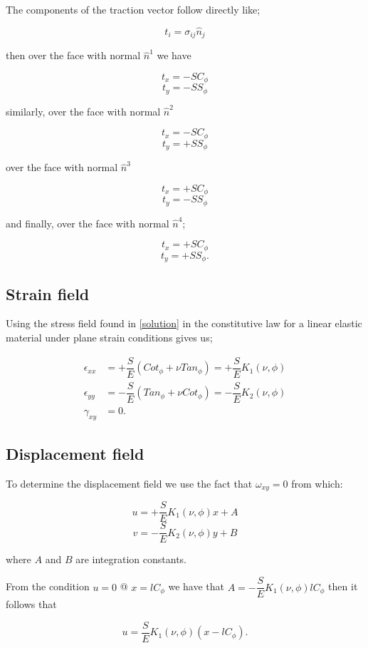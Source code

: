 The components of the traction vector follow directly like;

\[t_{i}=\sigma_{ij}\hat{n}_{j}\]

then over the face with normal $\hat{n}^1$ we have

\[t_{x}=-SC_{\phi}\]
\[t_{y}=-SS_{\phi}\]

similarly, over the face with normal $\hat{n}^2$

\[t_{x}=-SC_{\phi}\]
\[t_{y}=+SS_{\phi}\]

over the face with normal $\hat{n}^3$ 

\[t_{x}=+SC_{\phi}\]
\[t_{y}=-SS_{\phi}\]

and finally, over the face with normal $\hat{n}^4$;

\[t_{x}=+SC_{\phi}\]
\[t_{y}=+SS_{\phi}.\]

\subsection*{Strain field}

Using the stress field found in \cref{solution} in the constitutive law for a linear elastic material under plane strain conditions gives us;


\begin{equation}
\begin{aligned}
\epsilon_{xx}&=+\dfrac{S}{E}\left(Cot_{\phi}+\nu Tan_{\phi}\right)=+\dfrac{S}{E}K_{1}(\nu , \phi)\\
\epsilon_{yy}&=-\dfrac{S}{E}\left(Tan_{\phi}+\nu Cot_{\phi}\right)=-\dfrac{S}{E}K_{2}(\nu , \phi)\\
\gamma_{xy}&=0.
\end{aligned}
\label{strain part}
\end{equation}

\subsection*{Displacement field}

To determine the displacement field we use the fact that $\omega_{xy}=0$ from which:

\[u=+\dfrac{S}{E} K_{1}(\nu , \phi)x+A\]
\[v=-\dfrac{S}{E} K_{2}(\nu , \phi)y+B\]


where $A$ and $B$ are integration constants.

From the condition $u=0$ @ $x=lC_{\phi}$ we have that $A=-\dfrac{S}{E} K_{1}(\nu , \phi)lC_{\phi}$ then it follows that

\[u=\dfrac{S}{E} K_{1}(\nu , \phi)(x-lC_{\phi}).\]

